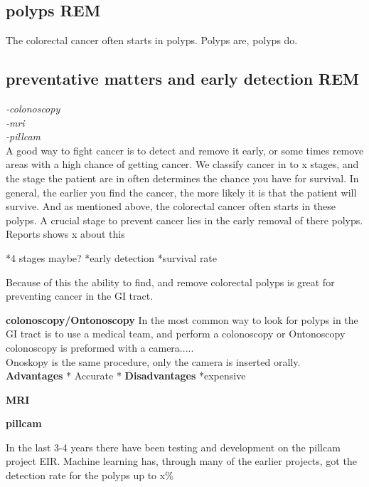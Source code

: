 	
	\vspace{10px}
	\subsection{polyps REM}
	The colorectal cancer often starts in polyps. 
	Polyps are, polyps do.\\
	
	\vspace{10px}
	\subsection{preventative matters and early detection REM}
	\textit{-colonoscopy\\ 
		-mri\\
		-pillcam\\}
	A good way to fight cancer is to detect and remove it early, or some times remove areas with a high chance of getting cancer.
	We classify cancer in to x stages, and the stage the patient are in often determines the chance you have for survival. 
	In general, the earlier you find the cancer, the more likely it is that the patient will survive. 
	And as mentioned above, the colorectal cancer often starts in these polyps. A crucial stage to prevent cancer lies in the 
	early removal of there polyps.
	Reports shows x about this %
	
	*4 stages maybe?
	*early detection
	*survival rate
	
		
	Because of this the ability to find, and remove colorectal polyps is great for preventing cancer in the GI tract. 
	
	
	\vspace{10px}
	\textbf{colonoscopy/Ontonoscopy}
	In the most common way to look for polyps in the GI tract is to use a medical team, and perform a colonoscopy or Ontonoscopy
	colonoscopy is preformed with a camera.....\\
	Onoskopy is the same procedure, only the camera is inserted orally. \\
	\textbf{Advantages}
	  * Accurate 
	  *
	\vspace{10px}
	\textbf{Disadvantages}
	  *expensive 
	
	\vspace{10px}
	\textbf{MRI}
	
	\vspace{10px}
	\textbf{pillcam}
	
	In the last 3-4 years there have been testing and development on the pillcam project EIR. Machine learning has, through 
	many of the earlier projects, got the detection rate for the polyps up to x\% %
	

